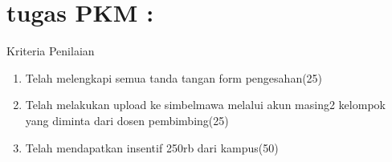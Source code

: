 \section{tugas PKM :}
Kriteria Penilaian
\begin{enumerate}
\item Telah melengkapi semua tanda tangan form pengesahan(25)
\item Telah melakukan upload ke simbelmawa melalui akun masing2 kelompok yang diminta dari dosen pembimbing(25)
\item Telah mendapatkan insentif 250rb dari kampus(50)
\end{enumerate}